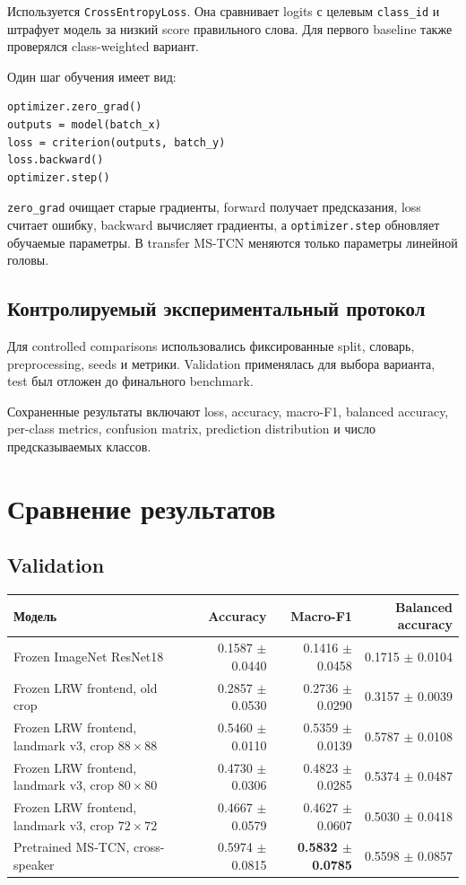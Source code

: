 \documentclass[12pt,a4paper]{article}
\begin{document}
Используется \texttt{CrossEntropyLoss}. Она сравнивает logits с целевым
\texttt{class\_id} и штрафует модель за низкий score правильного слова.
Для первого baseline также проверялся class-weighted вариант.

Один шаг обучения имеет вид:

\begin{verbatim}
optimizer.zero_grad()
outputs = model(batch_x)
loss = criterion(outputs, batch_y)
loss.backward()
optimizer.step()
\end{verbatim}

\texttt{zero\_grad} очищает старые градиенты, forward получает предсказания,
loss считает ошибку, backward вычисляет градиенты, а \texttt{optimizer.step}
обновляет обучаемые параметры. В transfer MS-TCN меняются только параметры
линейной головы.

\subsection{Контролируемый экспериментальный протокол}

Для controlled comparisons использовались фиксированные split, словарь,
preprocessing, seeds и метрики. Validation применялась для выбора варианта,
test был отложен до финального benchmark.

Сохраненные результаты включают loss, accuracy, macro-F1, balanced accuracy,
per-class metrics, confusion matrix, prediction distribution и число
предсказываемых классов.

\section{Сравнение результатов}

\subsection{Validation}

\begin{table}[htbp]
\centering
\begin{tabularx}{\textwidth}{>{\raggedright\arraybackslash}Xrrr}
\toprule
Модель & Accuracy & Macro-F1 & Balanced accuracy \\
\midrule
Frozen ImageNet ResNet18 & 0.1587 $\pm$ 0.0440 & 0.1416 $\pm$ 0.0458 & 0.1715 $\pm$ 0.0104 \\
Frozen LRW frontend, old crop & 0.2857 $\pm$ 0.0530 & 0.2736 $\pm$ 0.0290 & 0.3157 $\pm$ 0.0039 \\
Frozen LRW frontend, landmark v3, crop $88\times88$ & 0.5460 $\pm$ 0.0110 & 0.5359 $\pm$ 0.0139 & 0.5787 $\pm$ 0.0108 \\
Frozen LRW frontend, landmark v3, crop $80\times80$ & 0.4730 $\pm$ 0.0306 & 0.4823 $\pm$ 0.0285 & 0.5374 $\pm$ 0.0487 \\
Frozen LRW frontend, landmark v3, crop $72\times72$ & 0.4667 $\pm$ 0.0579 & 0.4627 $\pm$ 0.0607 & 0.5030 $\pm$ 0.0418 \\
Pretrained MS-TCN, cross-speaker & 0.5974 $\pm$ 0.0815 & \textbf{0.5832 $\pm$ 0.0785} & 0.5598 $\pm$ 0.0857 \\
\bottomrule
\end{tabularx}
\end{table}
\end{document}
